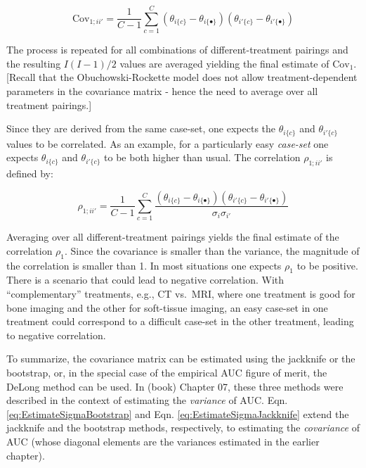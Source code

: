 \documentclass[
]{book}
\begin{document}
\begin{equation}
\text{Cov}_{1;ii'} = \frac{1}{C-1}\sum_{c=1}^{C} \left ( \theta_{i\{c\}} - \theta_{i\{\bullet\}} \right) \left ( \theta_{i'\{c\}} - \theta_{i'\{\bullet\}} \right)
\label{eq:EstimateCov}
\end{equation}

The process is repeated for all combinations of different-treatment pairings and the resulting \(I(I-1)/2\) values are averaged yielding the final estimate of \(\text{Cov}_1\). {[}Recall that the Obuchowski-Rockette model does not allow treatment-dependent parameters in the covariance matrix - hence the need to average over all treatment pairings.{]}

Since they are derived from the same case-set, one expects the \(\theta_{i\{c\}}\) and \(\theta_{i'\{c\}}\) values to be correlated. As an example, for a particularly easy \emph{case-set} one expects \(\theta_{i\{c\}}\) and \(\theta_{i'\{c\}}\) to be both higher than usual. The correlation \(\rho_{1;ii'}\) is defined by:

\begin{equation}
\rho_{1;ii'} = \frac{1}{C-1}\sum_{c=1}^{C} \frac {\left ( \theta_{i\{c\}} - \theta_{i\{\bullet\}} \right) \left ( \theta_{i'\{c\}} - \theta_{i'\{\bullet\}} \right)}{\sigma_i \sigma_{i'} }
\label{eq:EstimateRho}
\end{equation}

Averaging over all different-treatment pairings yields the final estimate of the correlation \(\rho_1\). Since the covariance is smaller than the variance, the magnitude of the correlation is smaller than 1. In most situations one expects \(\rho_1\) to be positive. There is a scenario that could lead to negative correlation. With ``complementary'' treatments, e.g., CT vs.~MRI, where one treatment is good for bone imaging and the other for soft-tissue imaging, an easy case-set in one treatment could correspond to a difficult case-set in the other treatment, leading to negative correlation.

To summarize, the covariance matrix can be estimated using the jackknife or the bootstrap, or, in the special case of the empirical AUC figure of merit, the DeLong method can be used. In (book) Chapter 07, these three methods were described in the context of estimating the \emph{variance} of AUC. Eqn. \eqref{eq:EstimateSigmaBootstrap} and Eqn. \eqref{eq:EstimateSigmaJackknife} extend the jackknife and the bootstrap methods, respectively, to estimating the \emph{covariance} of AUC (whose diagonal elements are the variances estimated in the earlier chapter).
\end{document}

